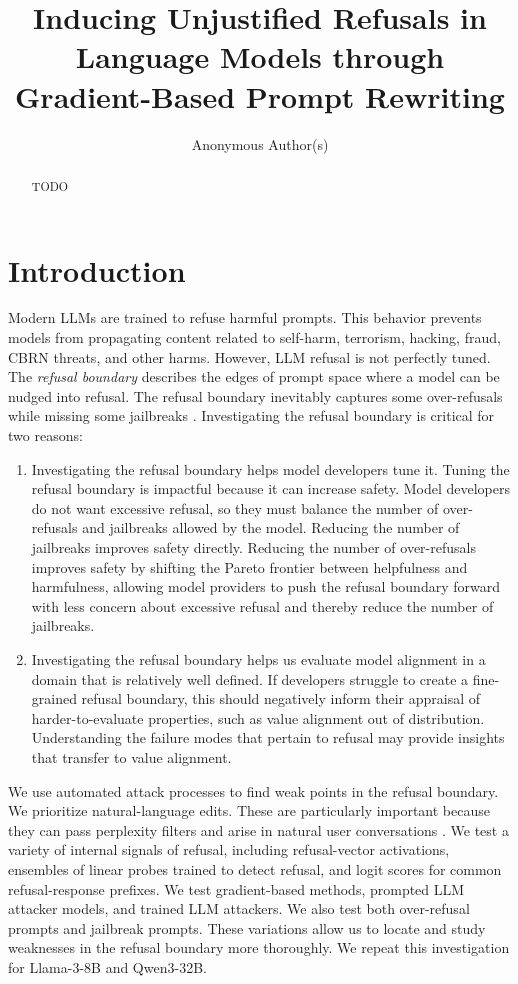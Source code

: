 \documentclass{article}
\title{Inducing Unjustified Refusals in Language Models through Gradient-Based Prompt Rewriting}
\author{Anonymous Author(s)}
\begin{document}
\maketitle

\begin{abstract}
TODO
\end{abstract}

\section{Introduction}

Modern LLMs are trained to refuse harmful prompts. This behavior prevents models from propagating content related to self-harm, terrorism, hacking, fraud, CBRN threats, and other harms. However, LLM refusal is not perfectly tuned. The \textit{refusal boundary} describes the edges of prompt space where a model can be nudged into refusal. The refusal boundary inevitably captures some over-refusals while missing some jailbreaks \citep{rottger2024xstest,cui2024orbench}. Investigating the refusal boundary is critical for two reasons:

\begin{enumerate}
    \item Investigating the refusal boundary helps model developers tune it. Tuning the refusal boundary is impactful because it can increase safety. Model developers do not want excessive refusal, so they must balance the number of over-refusals and jailbreaks allowed by the model. Reducing the number of jailbreaks improves safety directly. Reducing the number of over-refusals improves safety by shifting the Pareto frontier between helpfulness and harmfulness, allowing model providers to push the refusal boundary forward with less concern about excessive refusal and thereby reduce the number of jailbreaks.

    \item Investigating the refusal boundary helps us evaluate model alignment in a domain that is relatively well defined. If developers struggle to create a fine-grained refusal boundary, this should negatively inform their appraisal of harder-to-evaluate properties, such as value alignment out of distribution. Understanding the failure modes that pertain to refusal may provide insights that transfer to value alignment.
\end{enumerate}

We use automated attack processes to find weak points in the refusal boundary. We prioritize natural-language edits. These are particularly important because they can pass perplexity filters and arise in natural user conversations \citep{wichers2024gradient}. We test a variety of internal signals of refusal, including refusal-vector activations, ensembles of linear probes trained to detect refusal, and logit scores for common refusal-response prefixes. We test gradient-based methods, prompted LLM attacker models, and trained LLM attackers. We also test both over-refusal prompts and jailbreak prompts. These variations allow us to locate and study weaknesses in the refusal boundary more thoroughly. We repeat this investigation for Llama-3-8B and Qwen3-32B.
\end{document}
